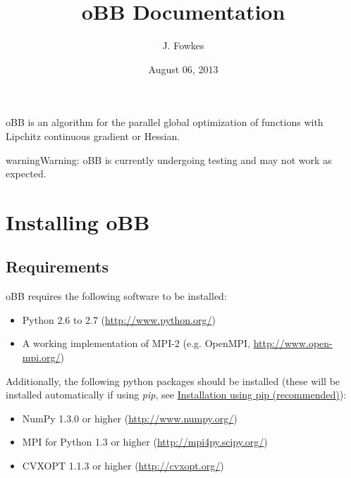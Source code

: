 \documentclass[letterpaper,11pt,openany,oneside]{sphinxmanual}
\title{oBB Documentation}
\date{August 06, 2013}
\author{J. Fowkes}
\begin{document}
\maketitle
\tableofcontents
{}\label{index::doc}


oBB is an algorithm for the parallel global optimization of functions with Lipchitz continuous gradient or Hessian.

\begin{notice}{warning}{Warning:}
oBB is currently undergoing testing and may not work as expected.
\end{notice}


\chapter{Installing oBB}
\label{install:installing-obb}\label{install::doc}\label{install:obb-documentation}

\section{Requirements}
\label{install:requirements}
oBB requires the following software to be installed:
\begin{itemize}
\item {} 
Python 2.6 to 2.7 (\href{http://www.python.org/}{http://www.python.org/})

\item {} 
A working implementation of MPI-2 (e.g. OpenMPI, \href{http://www.open-mpi.org/}{http://www.open-mpi.org/})

\end{itemize}

Additionally, the following python packages should be installed (these will be installed automatically if using \emph{pip}, see {\hyperref[install:installation-using-pip-recommended]{Installation using pip (recommended)}}):
\begin{itemize}
\item {} 
NumPy 1.3.0 or higher (\href{http://www.numpy.org/}{http://www.numpy.org/})

\item {} 
MPI for Python 1.3 or higher (\href{http://mpi4py.scipy.org/}{http://mpi4py.scipy.org/})

\item {} 
CVXOPT 1.1.3 or higher (\href{http://cvxopt.org/}{http://cvxopt.org/})

\end{itemize}
\end{document}
